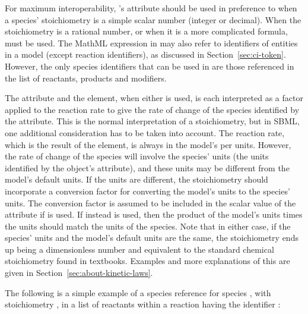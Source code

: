 For maximum interoperability, \SpeciesReference's  attribute
should be used in preference to  when a
species' stoichiometry is a simple scalar number (integer or
decimal).  When the stoichiometry is a rational number, or when it
is a more complicated formula,  must be
used.  The MathML expression in  may also
refer to identifiers of entities in a model (except reaction
identifiers), as discussed in Section~\ref{sec:ci-token}.
However, the only species identifiers that can be used in
 are those referenced in the \Reaction
list of reactants, products and modifiers.

The  attribute and the
 element, when either is used, is each
interpreted as a factor applied to the reaction rate to give the
rate of change of the species identified by the 
attribute.  This is the normal interpretation of a stoichiometry,
but in SBML, one additional consideration has to be taken into
account.  The reaction rate, which is the result of the
\KineticLaw {} element, is always in the model's
 per  units.  However, the rate
of change of the species will involve the species'
 units (\ie the units identified by the
\Species object's  attribute), and these
units may be different from the model's default
 units.  If the units are different, the
stoichiometry should incorporate a conversion factor for converting
the model's  units to the species'
 units.  The conversion factor is assumed to
be included in the scalar value of the 
attribute if  is used.  If instead
 is used, then the product of the model's
 units times the 
units should match the  units of the species.
Note that in either case, if the species' units and the model's
default  units are the same, the stoichiometry
ends up being a dimensionless number and equivalent to the
standard chemical stoichiometry found in textbooks.  Examples and
more explanations of this are given in
Section~\ref{sec:about-kinetic-laws}.

The following is a simple example of a species reference for
species , with stoichiometry , in a list of
reactants within a reaction having the identifier :


